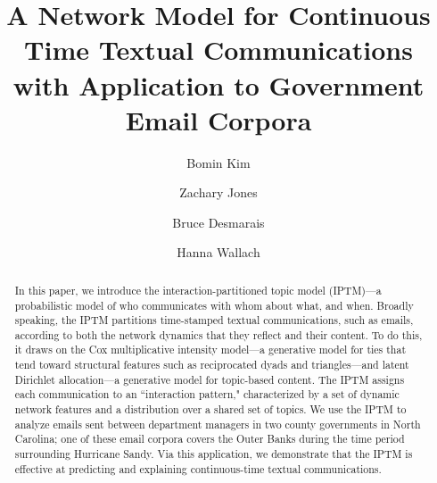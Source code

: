 \documentclass[a4paper]{article}
\title{A Network Model for Continuous Time Textual Communications\\ with Application to Government Email Corpora}
\author[1]{Bomin Kim}
\author[1]{Zachary Jones}
\author[1]{Bruce Desmarais}
\author[2,3]{Hanna Wallach}
\affil[1]{Pennsylvania State University}
\affil[2]{Microsoft Research NYC}
\affil[3]{University of Massachusetts Amherst}
\begin{document}
\maketitle
\begin{abstract}
	
	\noindent In this paper, we introduce the interaction-partitioned topic model
	(IPTM)---a probabilistic model of who communicates with whom about
	what, and when. Broadly speaking, the IPTM partitions time-stamped
	textual communications, such as emails, according to both the network
	dynamics that they reflect and their content. To do this, it draws on
	the Cox multiplicative intensity model---a generative model for ties
	that tend toward structural features such as reciprocated dyads and
	triangles---and latent Dirichlet allocation---a generative model for
	topic-based content. The IPTM assigns each communication to an
	``interaction pattern," characterized by a set of dynamic network
	features and a distribution over a shared set of topics. We use the
	IPTM to analyze emails sent between department managers in two county
	governments in North Carolina; one of these email corpora covers the
	Outer Banks during the time period surrounding Hurricane Sandy. Via
	this application, we demonstrate that the IPTM is effective at
	predicting and explaining continuous-time textual communications.	
\end{abstract}
\end{document}
